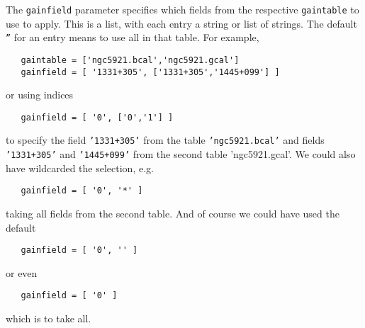The {\tt gainfield} parameter specifies which fields from the
respective {\tt gaintable} to use to apply.  This is a list,
with each entry a string or list of strings.  The default 
{\tt ''} for an entry means to use all in that table.  For
example,
\small
\begin{verbatim}
   gaintable = ['ngc5921.bcal','ngc5921.gcal']
   gainfield = [ '1331+305', ['1331+305','1445+099'] ]
\end{verbatim}
\normalsize
or using indices
\small
\begin{verbatim}
   gainfield = [ '0', ['0','1'] ]
\end{verbatim}
\normalsize
to specify the field {\tt '1331+305'} from the table 
{\tt 'ngc5921.bcal'} and fields {\tt '1331+305'} and 
{\tt '1445+099'} from the second table 'ngc5921.gcal'.
We could also have wildcarded the selection, e.g.
\small
\begin{verbatim}
   gainfield = [ '0', '*' ]
\end{verbatim}
\normalsize
taking all fields from the second table.  And of course we could have
used the default
\small
\begin{verbatim}
   gainfield = [ '0', '' ]
\end{verbatim}
\normalsize
or even
\small
\begin{verbatim}
   gainfield = [ '0' ]
\end{verbatim}
\normalsize
which is to take all.

